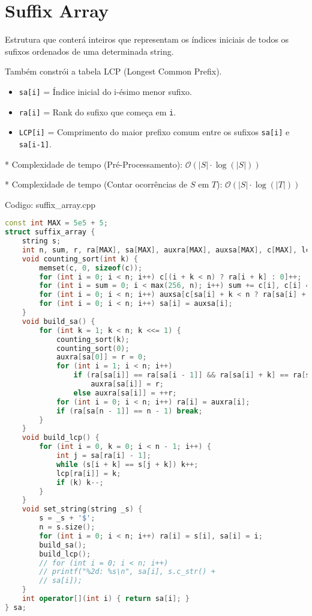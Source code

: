 \documentclass[10pt, a4paper, oneside]{book}
\begin{document}
\section{Suffix Array}


Estrutura que conterá inteiros que representam os índices iniciais de todos os sufixos ordenados de uma determinada string.



Também constrói a tabela LCP (Longest Common Prefix).



\begin{itemize}
\item \texttt{sa[i]} = Índice inicial do i-ésimo menor sufixo.
\item \texttt{ra[i]} = Rank do sufixo que começa em \texttt{i}.
\item \texttt{LCP[i]} = Comprimento do maior prefixo comum entre os sufixos \texttt{sa[i]} e \texttt{sa[i-1]}.
\end{itemize}



* Complexidade de tempo (Pré-Processamento): $\mathcal{O}(|S| \cdot \log(|S|))$

* Complexidade de tempo (Contar ocorrências de $S$ em $T$): $\mathcal{O}(|S| \cdot \log(|T|))$

\hfill

Codigo: suffix\_array.cpp

\begin{lstlisting}[language=C++]
const int MAX = 5e5 + 5;
struct suffix_array {
    string s;
    int n, sum, r, ra[MAX], sa[MAX], auxra[MAX], auxsa[MAX], c[MAX], lcp[MAX];
    void counting_sort(int k) {
        memset(c, 0, sizeof(c));
        for (int i = 0; i < n; i++) c[(i + k < n) ? ra[i + k] : 0]++;
        for (int i = sum = 0; i < max(256, n); i++) sum += c[i], c[i] = sum - c[i];
        for (int i = 0; i < n; i++) auxsa[c[sa[i] + k < n ? ra[sa[i] + k] : 0]++] = sa[i];
        for (int i = 0; i < n; i++) sa[i] = auxsa[i];
    }
    void build_sa() {
        for (int k = 1; k < n; k <<= 1) {
            counting_sort(k);
            counting_sort(0);
            auxra[sa[0]] = r = 0;
            for (int i = 1; i < n; i++)
                if (ra[sa[i]] == ra[sa[i - 1]] && ra[sa[i] + k] == ra[sa[i - 1] + k])
                    auxra[sa[i]] = r;
                else auxra[sa[i]] = ++r;
            for (int i = 0; i < n; i++) ra[i] = auxra[i];
            if (ra[sa[n - 1]] == n - 1) break;
        }
    }
    void build_lcp() {
        for (int i = 0, k = 0; i < n - 1; i++) {
            int j = sa[ra[i] - 1];
            while (s[i + k] == s[j + k]) k++;
            lcp[ra[i]] = k;
            if (k) k--;
        }
    }
    void set_string(string _s) {
        s = _s + '$';
        n = s.size();
        for (int i = 0; i < n; i++) ra[i] = s[i], sa[i] = i;
        build_sa();
        build_lcp();
        // for (int i = 0; i < n; i++)
        // printf("%2d: %s\n", sa[i], s.c_str() +
        // sa[i]);
    }
    int operator[](int i) { return sa[i]; }
} sa;
\end{lstlisting}
\hfill
\end{document}

